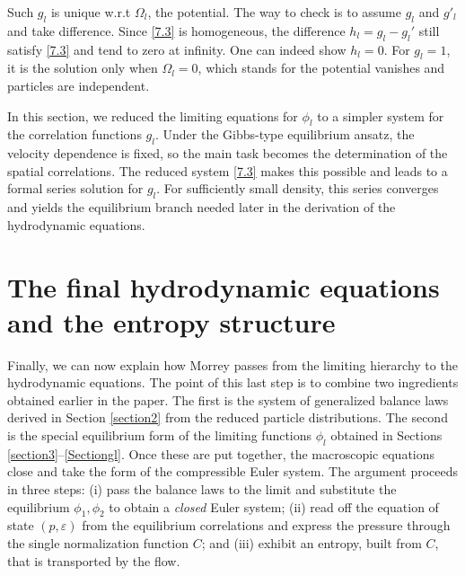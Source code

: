 \documentclass[11pt]{article}
\begin{document}
Such $g_l$ is unique w.r.t $\Omega_l$, the potential. The way to check is to assume $g_l$ and $g'_l$ and take difference. Since \eqref{7.3} is homogeneous, the difference $h_l=g_l-g_l'$ still satisfy \eqref{7.3} and tend to zero at infinity. One can indeed show $h_l=0$. For $g_l=1$, it is the solution only when $\Omega_l=0$, which stands for the potential vanishes and particles are independent.

In this section, we reduced the limiting equations for $\phi_l$ to a simpler system for the correlation functions $g_l$. Under the Gibbs-type equilibrium ansatz, the velocity dependence is fixed, so the main task becomes the determination of the spatial correlations. The reduced system \eqref{7.3} makes this possible and leads to a formal series solution for $g_l$. For sufficiently small density, this series converges and yields the equilibrium branch needed later in the derivation of the hydrodynamic equations.



\section{The final hydrodynamic equations and the entropy structure}\label{sectioneuler}

Finally, we can now explain how Morrey passes from the limiting hierarchy to the hydrodynamic equations. The point of this last step is to combine two ingredients obtained earlier in the paper. The first is the system of generalized balance laws derived in Section \ref{section2} from the reduced particle distributions. The second is the special equilibrium form of the limiting functions $\phi_l$ obtained in Sections \ref{section3}--\ref{Sectiongl}. Once these are put together, the macroscopic equations close and take the form of the compressible Euler system. The argument proceeds in three steps: (i) pass the balance laws to the limit and substitute the equilibrium $\phi_1,\phi_2$ to obtain a \emph{closed} Euler system; (ii) read off the equation of state $(p,\varepsilon)$ from the equilibrium correlations and express the pressure through the single normalization function $C$; and (iii) exhibit an entropy, built from $C$, that is transported by the flow.
\end{document}

